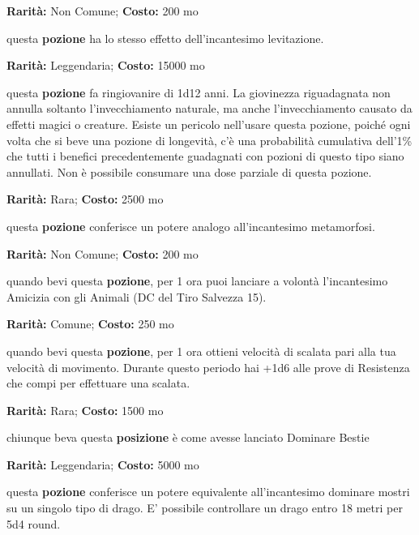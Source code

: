 \begin{multicols}{2}

\textbf{Rarità:} Non Comune; \textbf{Costo:} 200 mo

questa \textbf{pozione} ha lo stesso effetto dell'incantesimo levitazione.


\textbf{Rarità:} Leggendaria; \textbf{Costo:} 15000 mo

questa \textbf{pozione} fa ringiovanire di 1d12 anni. La giovinezza riguadagnata non annulla soltanto l'invecchiamento naturale, ma anche l'invecchiamento causato da effetti magici o creature. Esiste un pericolo nell'usare questa pozione, poiché ogni volta che si beve una pozione di longevità, c'è una probabilità cumulativa dell'1\% che tutti i benefici precedentemente guadagnati con pozioni di questo tipo siano annullati. Non è possibile consumare una dose parziale di questa pozione.


\textbf{Rarità:} Rara; \textbf{Costo:} 2500 mo

questa \textbf{pozione} conferisce un potere analogo all'incantesimo metamorfosi.


\textbf{Rarità:} Non Comune; \textbf{Costo:} 200 mo

quando bevi questa \textbf{pozione}, per 1 ora puoi lanciare a volontà l'incantesimo Amicizia con gli Animali (DC del Tiro Salvezza 15).


\textbf{Rarità:} Comune; \textbf{Costo:} 250 mo

quando bevi questa \textbf{pozione}, per 1 ora ottieni velocità di scalata pari alla tua velocità di movimento. Durante questo periodo hai +1d6 alle prove di Resistenza che compi per effettuare una scalata.


\textbf{Rarità:} Rara; \textbf{Costo:} 1500 mo

chiunque beva questa \textbf{posizione} è come avesse lanciato Dominare Bestie


\textbf{Rarità:} Leggendaria; \textbf{Costo:} 5000 mo

questa \textbf{pozione} conferisce un potere equivalente all'incantesimo dominare mostri su un singolo tipo di drago. E' possibile controllare un drago entro 18 metri per 5d4 round.


\end{multicols}
